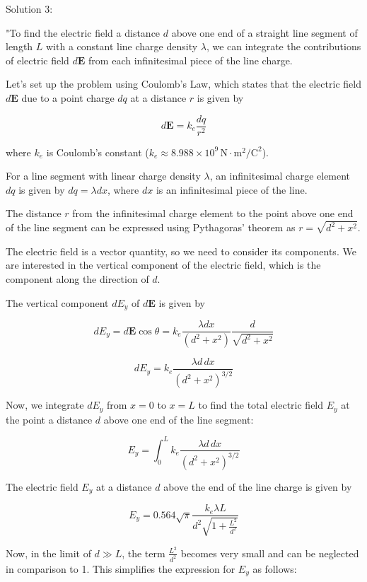 Solution 3: 

"To find the electric field a distance \( d \) above one end of a straight line segment of length \( L \) with a constant line charge density \( \lambda \), we can integrate the contributions of electric field \( d\mathbf{E} \) from each infinitesimal piece of the line charge.

Let's set up the problem using Coulomb's Law, which states that the electric field \( d\mathbf{E} \) due to a point charge \( dq \) at a distance \( r \) is given by

\[ d\mathbf{E} = k_e \frac{dq}{r^2} \]

where \( k_e \) is Coulomb's constant (\( k_e \approx 8.988 \times 10^9 \, \text{N}\cdot\text{m}^2/\text{C}^2 \)).

For a line segment with linear charge density \( \lambda \), an infinitesimal charge element \( dq \) is given by \( dq = \lambda dx \), where \( dx \) is an infinitesimal piece of the line.

The distance \( r \) from the infinitesimal charge element to the point above one end of the line segment can be expressed using Pythagoras' theorem as \( r = \sqrt{d^2 + x^2} \).

The electric field is a vector quantity, so we need to consider its components. We are interested in the vertical component of the electric field, which is the component along the direction of \( d \).

The vertical component \( dE_y \) of \( d\mathbf{E} \) is given by

\[ dE_y = d\mathbf{E} \cos\theta = k_e \frac{\lambda dx}{(d^2 + x^2)} \frac{d}{\sqrt{d^2 + x^2}} \]

\[ dE_y = k_e \frac{\lambda d\,dx}{(d^2 + x^2)^{3/2}} \]

Now, we integrate \( dE_y \) from \( x = 0 \) to \( x = L \) to find the total electric field \( E_y \) at the point a distance \( d \) above one end of the line segment:

\[ E_y = \int_0^L k_e \frac{\lambda d\,dx}{(d^2 + x^2)^{3/2}} \]

The electric field \( E_y \) at a distance \( d \) above the end of the line charge is given by

\[ E_y = 0.564 \sqrt{\pi} \frac{k_e \lambda L}{d^2 \sqrt{1 + \frac{L^2}{d^2}}} \]

Now, in the limit of \( d \gg L \), the term \( \frac{L^2}{d^2} \) becomes very small and can be neglected in comparison to 1. This simplifies the expression for \( E_y \) as follows:

